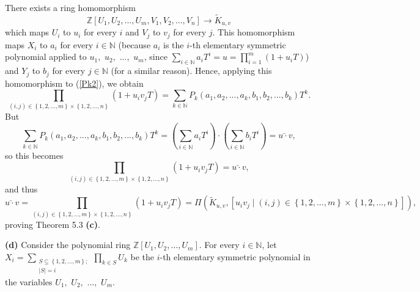 \documentclass[numbers=enddot,12pt,final,onecolumn,notitlepage]{scrartcl}%
\begin{document}
There exists a ring homomorphism%
\[
\mathbb{Z}\left[  U_{1},U_{2},...,U_{m},V_{1},V_{2},...,V_{n}\right]
\rightarrow\widetilde{K}_{u,v}%
\]
which maps $U_{i}$ to $u_{i}$ for every $i$ and $V_{j}$ to $v_{j}$ for every
$j$. This homomorphism maps $X_{i}$ to $a_{i}$ for every $i\in\mathbb{N}$
(because $a_{i}$ is the $i$-th elementary symmetric polynomial applied to
$u_{1},$ $u_{2},$ $...,$ $u_{m}$, since $\sum\limits_{i\in\mathbb{N}}%
a_{i}T^{i}=u=\prod\limits_{i=1}^{m}\left(  1+u_{i}T\right)  $) and $Y_{j}$ to
$b_{j}$ for every $j\in\mathbb{N}$ (for a similar reason). Hence, applying
this homomorphism to (\ref{Pk2}), we obtain%
\[
\prod_{\left(  i,j\right)  \in\left\{  1,2,...,m\right\}  \times\left\{
1,2,...,n\right\}  }\left(  1+u_{i}v_{j}T\right)  =\sum_{k\in\mathbb{N}}%
P_{k}\left(  a_{1},a_{2},...,a_{k},b_{1},b_{2},...,b_{k}\right)  T^{k}.
\]
But%
\[
\sum_{k\in\mathbb{N}}P_{k}\left(  a_{1},a_{2},...,a_{k},b_{1},b_{2}%
,...,b_{k}\right)  T^{k}=\left(  \sum_{i\in\mathbb{N}}a_{i}T^{i}\right)
\widehat{\cdot}\left(  \sum_{i\in\mathbb{N}}b_{i}T^{i}\right)
=u\widehat{\cdot}v,
\]
so this becomes%
\[
\prod_{\left(  i,j\right)  \in\left\{  1,2,...,m\right\}  \times\left\{
1,2,...,n\right\}  }\left(  1+u_{i}v_{j}T\right)  =u\widehat{\cdot}v,
\]
and thus%
\[
u\widehat{\cdot}v=\prod_{\left(  i,j\right)  \in\left\{  1,2,...,m\right\}
\times\left\{  1,2,...,n\right\}  }\left(  1+u_{i}v_{j}T\right)  =\Pi\left(
\widetilde{K}_{u,v},\left[  u_{i}v_{j}\mid\left(  i,j\right)  \in\left\{
1,2,...,m\right\}  \times\left\{  1,2,...,n\right\}  \right]  \right)  ,
\]
proving Theorem 5.3 \textbf{(c)}.

\textbf{(d)} Consider the polynomial ring $\mathbb{Z}\left[  U_{1}%
,U_{2},...,U_{m}\right]  $. For every $i\in\mathbb{N}$, let $X_{i}%
=\sum\limits_{\substack{S\subseteq\left\{  1,2,...,m\right\}  ;\\\left\vert
S\right\vert =i}}\prod\limits_{k\in S}U_{k}$ be the $i$-th elementary
symmetric polynomial in the variables $U_{1},$ $U_{2},$ $...,$ $U_{m}$.
\end{document}
